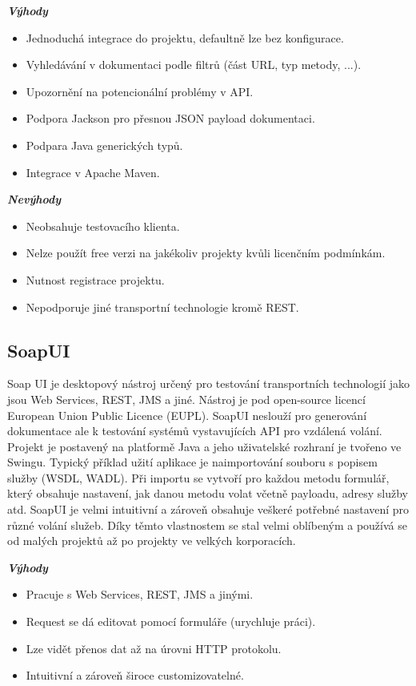 \documentclass[11pt,twoside,a4paper]{book}
\begin{document}
\begin{itemize}
\textbf{\textit{Výhody}}

\begin{itemize}
  \item Jednoduchá integrace do projektu, defaultně lze bez konfigurace.
  \item Vyhledávání v dokumentaci podle filtrů (část URL, typ metody, ...).
  \item Upozornění na potencionální problémy v API.
  \item Podpora Jackson pro přesnou JSON payload dokumentaci.
  \item Podpara Java generických typů.
  \item Integrace v Apache Maven.
\end{itemize}

\textbf{\textit{Nevýhody}}

\begin{itemize}
  \item Neobsahuje testovacího klienta.
  \item Nelze použít free verzi na jakékoliv projekty kvůli licenčním podmínkám.
  \item Nutnost registrace projektu.
  \item Nepodporuje jiné transportní technologie kromě REST.
\end{itemize}

\subsection{SoapUI}

Soap UI je desktopový nástroj určený pro testování transportních technologií jako jsou Web
Services, REST, JMS a jiné. Nástroj je pod open-source licencí European Union Public
Licence (EUPL). SoapUI neslouží pro generování dokumentace ale k testování systémů
vystavujících API pro vzdálená volání. Projekt je postavený na platformě Java a jeho
uživatelské rozhraní je tvořeno ve Swingu. Typický příklad užití aplikace je naimportování
souboru s popisem služby (WSDL, WADL). Při importu se vytvoří pro každou metodu
formulář, který obsahuje nastavení, jak danou metodu volat včetně payloadu, adresy služby
atd. SoapUI je velmi intuitivní a zároveň obsahuje veškeré potřebné nastavení pro různé
volání služeb. Díky těmto vlastnostem se stal velmi oblíbeným a používá se od malých
projektů až po projekty ve velkých korporacích.

\textbf{\textit{Výhody}}

\begin{itemize}
  \item Pracuje s Web Services, REST, JMS a jinými.
  \item Request se dá editovat pomocí formuláře (urychluje práci).
  \item Lze vidět přenos dat až na úrovni HTTP protokolu.
  \item Intuitivní a zároveň široce customizovatelné.
\end{itemize}


\end{itemize}
\end{document}
